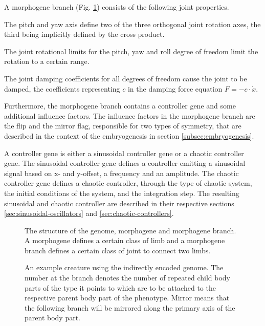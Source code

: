 \documentclass[main]{subfiles}
\begin{document}
A morphogene branch (Fig. \ref{figure:genome-structure}) consists of the following joint properties. %

The pitch and yaw axis define two of the three orthogonal joint rotation axes, the third being implicitly defined by the cross product. %

The joint rotational limits for the pitch, yaw and roll degree of freedom limit the rotation to a certain range. %

The joint damping coefficients for all degrees of freedom cause the joint to be damped, the coefficients representing \(c\) in the damping force equation \(F = -c \cdot \dot x\). %

Furthermore, the morphogene branch contains a controller gene and some additional influence factors. %
%
The influence factors in the morphogene branch are the flip and the mirror flag, responsible for two types of symmetry, that are described in the context of the embryogenesis in section \ref{subsec:embryogenesis}.

A controller gene is either a sinusoidal controller gene or a chaotic controller gene. %
%
The sinusoidal controller gene defines a controller emitting a sinusoidal signal based on x- and y-offset, a frequency and an amplitude. %
%
The chaotic controller gene defines a chaotic controller, through the type of chaotic system, the initial conditions of the system, and the integration step. %
%
The resulting sinusoidal and chaotic controller are described in their respective sections \ref{sec:sinusoidal-oscillators} and \ref{sec:chaotic-controllers}.

\begin{figure}[H]
\hspace*{-0.2in}


\caption[Indirectly encoded genome structure]{The structure of the genome, morphogene and morphogene branch. A morphogene defines a certain class of limb and a morphogene branch defines a certain class of joint to connect two limbs.}
\label{figure:genome-structure}
\end{figure}

\begin{figure}[H]
\center


\caption[Example creature using an indirectly encoded genome]{An example creature using the indirectly encoded genome. The number at the branch denotes the number of repeated child body parts of the type it points to which are to be attached to the respective parent body part of the phenotype. Mirror means that the following branch will be mirrored along the primary axis of the parent body part.}
\label{figure:indirect-genotype}
\end{figure}
\end{document}
